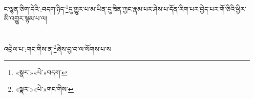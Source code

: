 ང་ལྷན་ཅིག་དེའི་:བདག་ཉིད་\footnote{«སྣར་»«པེ་»བདག་}དུ་གྱུར་པ་མ་ཡིན་དུ་ཟིན་ཀྱང་རྣམ་པར་ཤེས་པ་དོན་རིག་པར་བྱེད་པར་གོ་ཅིའི་ཕྱིར་མི་འགྱུར་སྙམ་པ་ལ།\chapter{ }འབྲེལ་པ་:གང་གིས་ན་\footnote{«སྣར་»«པེ་»གང་གིས་}ཞེས་བྱ་བ་ལ་སོགས་པ་ས